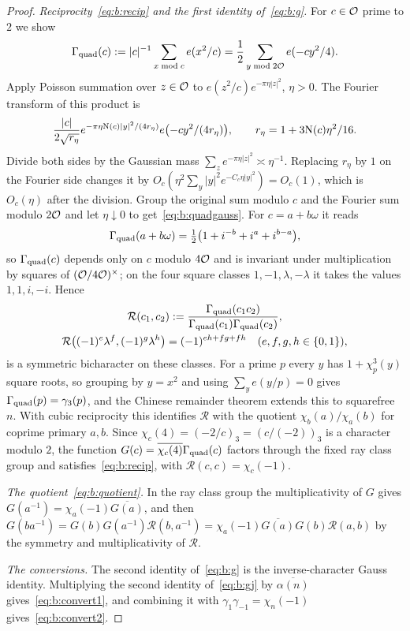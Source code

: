 \begin{proof}
\emph{Reciprocity~\eqref{eq:b:recip} and the first identity of~\eqref{eq:b:g}.} For $c\in\mathcal{O}$ prime to $2$ we show
\begin{equation}\label{eq:b:quadgauss}
  \Gamma_{\rm quad}(c):=|c|^{-1}\sum_{x\bmod c}e(x^2/c)=\frac12\sum_{y\bmod2\mathcal{O}}e(-cy^2/4).
\end{equation}
Apply Poisson summation over $z\in\mathcal{O}$ to $e(z^2/c)e^{-\pi\eta|z|^2}$, $\eta>0$. The Fourier transform of this product is
\[
  \frac{|c|}{2\sqrt{r_\eta}}e^{-\pi\eta\mathrm{N}(c)|y|^2/(4r_\eta)}e\bigl(-cy^2/(4r_\eta)\bigr),\qquad r_\eta=1+3\mathrm{N}(c)\eta^2/16.
\]
Divide both sides by the Gaussian mass $\sum_ze^{-\pi\eta|z|^2}\asymp\eta^{-1}$. Replacing $r_\eta$ by $1$ on the Fourier side changes it by $O_c(\eta^2\sum_y|y|^2e^{-C_c\eta|y|^2})=O_c(1)$, which is $O_c(\eta)$ after the division. Group the original sum modulo $c$ and the Fourier sum modulo $2\mathcal{O}$ and let $\eta\downarrow0$ to get~\eqref{eq:b:quadgauss}. For $c=a+b\omega$ it reads
\[
  \Gamma_{\rm quad}(a+b\omega)=\tfrac12\bigl(1+i^{-b}+i^a+i^{b-a}\bigr),
\]
so $\Gamma_{\rm quad}(c)$ depends only on $c$ modulo $4\mathcal{O}$ and is invariant under multiplication by squares of $(\mathcal{O}/4\mathcal{O})^\times$; on the four square classes $1,-1,\lambda,-\lambda$ it takes the values $1,1,i,-i$. Hence
\[
  \begin{gathered}
  \mathcal R(c_1,c_2):=\frac{\Gamma_{\rm quad}(c_1c_2)}{\Gamma_{\rm quad}(c_1)\Gamma_{\rm quad}(c_2)},\\
  \mathcal R\bigl((-1)^e\lambda^f,(-1)^g\lambda^h\bigr)=(-1)^{eh+fg+fh}\quad(e,f,g,h\in\{0,1\}),
  \end{gathered}
\]
is a symmetric bicharacter on these classes. For a prime $p$ every $y$ has $1+\chi_p^3(y)$ square roots, so grouping by $y=x^2$ and using $\sum_ye(y/p)=0$ gives $\Gamma_{\rm quad}(p)=\gamma_3(p)$, and the Chinese remainder theorem extends this to squarefree $n$. With cubic reciprocity this identifies $\mathcal R$ with the quotient $\chi_b(a)/\chi_a(b)$ for coprime primary $a,b$. Since $\chi_c(4)=(-2/c)_3=(c/(-2))_3$ is a character modulo $2$, the function $G(c)=\overline{\chi_c(4)}\Gamma_{\rm quad}(c)$ factors through the fixed ray class group and satisfies~\eqref{eq:b:recip}, with $\mathcal R(c,c)=\chi_c(-1)$.

\emph{The quotient~\eqref{eq:b:quotient}.} In the ray class group the multiplicativity of $G$ gives $G(a^{-1})=\chi_a(-1)\overline{G(a)}$, and then $G(ba^{-1})=G(b)G(a^{-1})\mathcal R(b,a^{-1})=\chi_a(-1)\overline{G(a)}G(b)\mathcal R(a,b)$ by the symmetry and multiplicativity of $\mathcal R$.

\emph{The conversions.} The second identity of~\eqref{eq:b:g} is the inverse-character Gauss identity. Multiplying the second identity of~\eqref{eq:b:gj} by $\overline{\alpha(n)}$ gives~\eqref{eq:b:convert1}, and combining it with $\gamma_1\gamma_{-1}=\chi_n(-1)$ gives~\eqref{eq:b:convert2}.
\end{proof}

